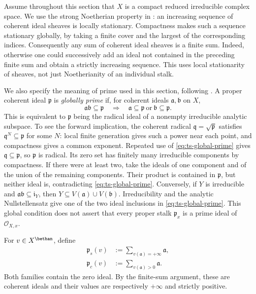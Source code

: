 Assume throughout this section that $X$ is a compact reduced
irreducible complex space.
We use the strong Noetherian property in
\cite[Lemma~2.1.1 and Remark~2.1.5]{MPTropicalV2}: an increasing
sequence of coherent ideal sheaves is locally stationary.
Compactness makes such a sequence stationary globally, by taking
a finite cover and the largest of the corresponding indices.
Consequently any sum of coherent ideal sheaves is a finite sum.
Indeed, otherwise one could successively add an ideal not contained
in the preceding finite sum and obtain a strictly increasing sequence.
This uses local stationarity of sheaves, not just Noetherianity of
an individual stalk.

We also specify the meaning of prime used in this section, following
\cite[Notations and Conventions, p.~6]{MPTropicalV2}.
A proper coherent ideal $\mathfrak p$ is \emph{globally prime} if,
for coherent ideals $\mathfrak a,\mathfrak b$ on $X$,
\[
 \mathfrak a\mathfrak b\subseteq\mathfrak p
 \quad\Longrightarrow\quad
 \mathfrak a\subseteq\mathfrak p
 \ \text{or}\ \mathfrak b\subseteq\mathfrak p.
\tag{58.13a}\label{eq:ts-global-prime}
\]
This is equivalent to $\mathfrak p$ being the radical ideal of a
nonempty irreducible analytic subspace.
To see the forward implication, the coherent radical
$\mathfrak q=\sqrt{\mathfrak p}$ satisfies
$\mathfrak q^N\subseteq\mathfrak p$ for some $N$: local finite
generation gives such a power near each point, and compactness
gives a common exponent. Repeated use of
\eqref{eq:ts-global-prime} gives $\mathfrak q\subseteq\mathfrak p$,
so $\mathfrak p$ is radical.
Its zero set has finitely many irreducible components by compactness.
If there were at least two, take the ideals of one component and
of the union of the remaining components.
Their product is contained in $\mathfrak p$, but neither ideal is,
contradicting \eqref{eq:ts-global-prime}.
Conversely, if $Y$ is irreducible and
$\mathfrak a\mathfrak b\subseteq\mathfrak i_Y$, then
$Y\subseteq V(\mathfrak a)\cup V(\mathfrak b)$.
Irreducibility and the analytic Nullstellensatz give one of the
two ideal inclusions in \eqref{eq:ts-global-prime}.
This global condition does not assert that every proper stalk
$\mathfrak p_x$ is a prime ideal of $\mathcal O_{X,x}$.

For $v\in X^\bethan$, define
\[
\begin{aligned}
 \mathfrak p_s(v)
   &:=\sum_{v(\mathfrak a)=+\infty}\mathfrak a,\\
 \mathfrak p_c(v)
   &:=\sum_{v(\mathfrak a)>0}\mathfrak a.
\end{aligned}
\tag{58.14}\label{eq:ts-support-center-ideals}
\]
Both families contain the zero ideal. By the finite-sum argument,
these are coherent ideals and their values are respectively
$+\infty$ and strictly positive.

